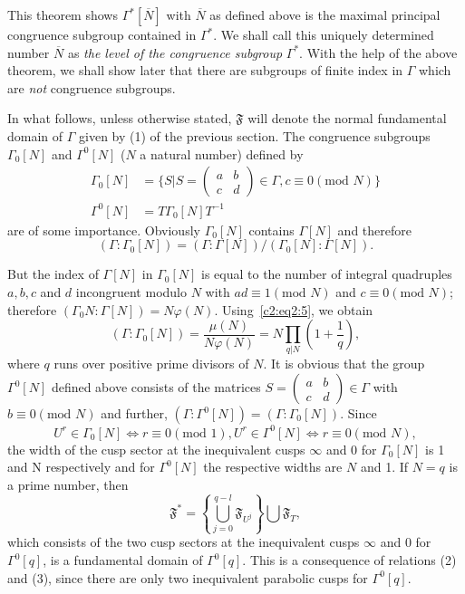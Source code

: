 This theorem shows $\Gamma^{\ast}[\overline{N}]$ with $\overline{N}$
as defined above is the maximal principal congruence subgroup
contained in $\Gamma^{\ast}$. We shall call this uniquely determined
number $\overline{N}$ as \textit{the level of the congruence subgroup}
$\Gamma^{\ast}$. With the help of the above theorem, we shall show
later that there are subgroups of finite index in $\Gamma$ which are
\textit{not} congruence subgroups.

In what follows, unless otherwise stated, $\mathfrak{F}$ will denote
the normal fundamental domain of $\Gamma$ given by (1) of the previous
section. The congruence \pageoriginale subgroups $\Gamma_0[N]$ and
$\Gamma^0[N]$ ($N$ a natural number) defined by 
\begin{align*}
\Gamma_0 [N] & = \{S|S =
\left(\begin{smallmatrix}a&b\\c&d \end{smallmatrix}\right)\in\Gamma,
c\equiv 0 (\text{mod } N)\}\\
\Gamma^0 [N] & = T \Gamma_0 [N] T^{-1}
\end{align*}
are of some importance. Obviously $\Gamma_0[N]$ contains $\Gamma[N]$
and therefore
$$
(\Gamma:\Gamma_0[N]) = (\Gamma:\Gamma[N])/(\Gamma_0[N]:\Gamma[N]).
$$

But the index of $\Gamma[N]$ in $\Gamma_0[N]$ is equal to the number
of integral quadruples $a,b,c$ and $d$ incongruent modulo $N$ with
$ad\equiv 1(\text{mod } N)$ and $c\equiv 0(\text{mod } N)$; therefore
$(\Gamma_0N:\Gamma[N]) = N \varphi(N)$. Using~\eqref{c2:eq2:5}, we obtain
$$
(\Gamma:\Gamma_0 [N]) = \frac{\mu(N)}{N\varphi(N)} = N \prod_{q|N}
\left(1+\frac{1}{q}\right),
$$
where $q$ runs over positive prime divisors of $N$. It is obvious that
the group $\Gamma^0[N]$ defined above consists of the matrices $S=
\left(\begin{smallmatrix} a&b\\c&d \end{smallmatrix}\right)\in
\Gamma$ with $b\equiv 0(\text{mod } N)$ and further, $(\Gamma: \Gamma^0
      [N])=(\Gamma: \Gamma_0[N])$. Since 
$$
U^r \in \Gamma_0 [N] \Leftrightarrow r \equiv 0(\text{mod } 1), U^r
\in \Gamma^0 [N] \Leftrightarrow r \equiv 0(\text{mod } N), 
$$
the width of the cusp sector at the inequivalent cusps $\infty$ and 0
for $\Gamma_0[N]$ is 1 and N respectively and for $\Gamma^0[N]$ the
respective widths are $N$ and 1. If $N=q$ is a prime number, then
$$
\mathfrak{F}^{\ast} = \left\{ \bigcup^{q-l}_{j=0}
\mathfrak{F}_{U^j}\right\} \bigcup \mathfrak{F}_T,
$$
which consists of the two cusp sectors at the inequivalent cusps
$\infty$ and 0 for $\Gamma^0[q]$, is a fundamental domain of
$\Gamma^0[q]$. This is a consequence of relations (2) and (3), since
there are only two inequivalent parabolic cusps \pageoriginale for
$\Gamma^0[q]$.

